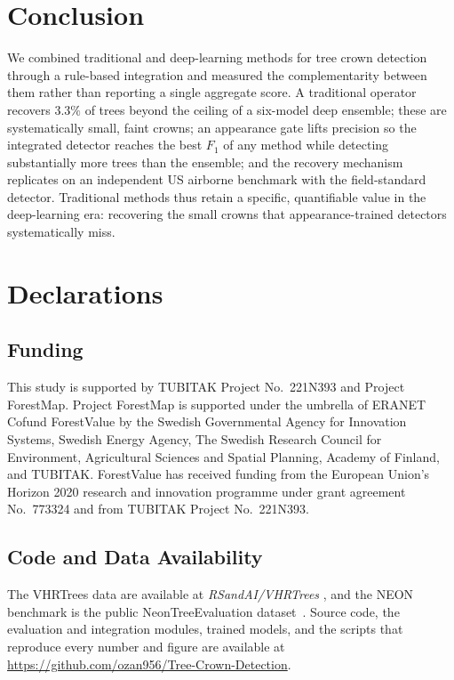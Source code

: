 \documentclass{article}
\begin{document}
\section{Conclusion}
We combined traditional and deep-learning methods for tree crown detection through a rule-based integration and measured the complementarity between them rather than reporting a single aggregate score. A traditional operator recovers $3.3\%$ of trees beyond the ceiling of a six-model deep ensemble; these are systematically small, faint crowns; an appearance gate lifts precision so the integrated detector reaches the best $F_1$ of any method while detecting substantially more trees than the ensemble; and the recovery mechanism replicates on an independent US airborne benchmark with the field-standard detector. Traditional methods thus retain a specific, quantifiable value in the deep-learning era: recovering the small crowns that appearance-trained detectors systematically miss.

\section*{Declarations}
\subsection*{Funding}
This study is supported by TUBITAK Project No.\ 221N393 and Project ForestMap. Project ForestMap is supported under the umbrella of ERANET Cofund ForestValue by the Swedish Governmental Agency for Innovation Systems, Swedish Energy Agency, The Swedish Research Council for Environment, Agricultural Sciences and Spatial Planning, Academy of Finland, and TUBITAK. ForestValue has received funding from the European Union's Horizon 2020 research and innovation programme under grant agreement No.\ 773324 and from TUBITAK Project No.\ 221N393.

\subsection*{Code and Data Availability}
The VHRTrees data are available at \textit{RSandAI/VHRTrees} \cite{10.3389/ffgc.2024.1495544}, and the NEON benchmark is the public NeonTreeEvaluation dataset~\cite{weinstein2021benchmark}. Source code, the evaluation and integration modules, trained models, and the scripts that reproduce every number and figure are available at \url{https://github.com/ozan956/Tree-Crown-Detection}.



\end{document}
